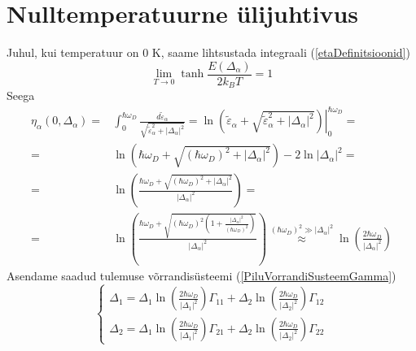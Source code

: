 \documentclass[class=article, crop=false]{standalone}
\begin{document}
\newpage	
\section{Nulltemperatuurne ülijuhtivus}
Juhul, kui temperatuur on 0 K, saame lihtsustada integraali (\ref{etaDefinitsioonid})
\begin{equation}\label{key}
	\lim_{T \rightarrow 0} \tanh \frac{E ( \Delta_{ \alpha})}{2 k_{B} T} = 1
\end{equation}
Seega
\begin{equation}\label{key}
	\begin{split}
		\eta_{ \alpha} (0, \Delta_{ \alpha}) = & \int_{0}^{ \hbar \omega_{D}} \frac{d \tilde{ \varepsilon}_{ \alpha}}{ \sqrt{ \tilde{ \varepsilon}_{ \alpha}^{2} + \left| \Delta_{ \alpha} \right|^{2}}} = \left. \ln \left( \tilde{ \varepsilon}_{ \alpha} + \sqrt{ \tilde{ \varepsilon}_{ \alpha}^{2} + \left| \Delta_{ \alpha} \right|^{2}} \right) \right|_{0}^{ \hbar \omega_{D}} = \\
		= & \ln \left( \hbar \omega_{D} + \sqrt{ \left( \hbar \omega_{D} \right)^{2} + \left| \Delta_{ \alpha} \right|^{2}} \right) - 2 \ln \left| \Delta_{ \alpha} \right|^{2} = \\
		= & \ln \left( \frac{ \hbar \omega_{D} + \sqrt{ \left( \hbar \omega_{D} \right)^{2} + \left| \Delta_{ \alpha} \right|^{2}}}{ \left| \Delta_{ \alpha} \right|^{2}} \right) = \\
		= & \ln \left( \frac{ \hbar \omega_{D} + \sqrt{ \left( \hbar \omega_{D} \right)^{2} \left( 1 + \frac{ \left| \Delta_{ \alpha} \right|^{2}}{ \left( \hbar \omega_{D} \right)^{2}} \right)}}{ \left| \Delta_{ \alpha} \right|^{2}} \right) \overset{\left( \hbar \omega_{D} \right)^{2} \gg \left| \Delta_{ \alpha} \right|^{2}}{ \approx} \ln \left( \frac{2 \hbar \omega_{D}}{ \left| \Delta_{ \alpha} \right|^{2}} \right) 
	\end{split}
\end{equation}
Asendame saadud tulemuse võrrandisüsteemi (\ref{PiluVorrandiSusteemGamma})
\begin{equation}\label{PiluVorrandiSusteemNullTemp}
	\begin{cases}
		\Delta_{1} = \Delta_{1} \ln \left( \frac{2 \hbar \omega_{D}}{ \left| \Delta_{ 1} \right|^{2}} \right) \Gamma_{11} + 
		\Delta_{2} \ln \left( \frac{2 \hbar \omega_{D}}{ \left| \Delta_{ 2} \right|^{2}} \right) \Gamma_{12} \\
		\Delta_{2} = \Delta_{1} \ln \left( \frac{2 \hbar \omega_{D}}{ \left| \Delta_{ 1} \right|^{2}} \right) \Gamma_{21} + \Delta_{2} \ln \left( \frac{2 \hbar \omega_{D}}{ \left| \Delta_{ 2} \right|^{2}} \right) \Gamma_{22}
	\end{cases}
\end{equation}
\end{document}

